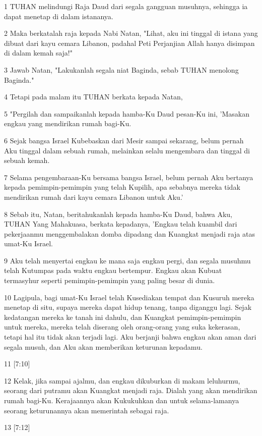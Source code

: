 \par 1 TUHAN melindungi Raja Daud dari segala gangguan musuhnya, sehingga ia dapat menetap di dalam istananya.
\par 2 Maka berkatalah raja kepada Nabi Natan, "Lihat, aku ini tinggal di istana yang dibuat dari kayu cemara Libanon, padahal Peti Perjanjian Allah hanya disimpan di dalam kemah saja!"
\par 3 Jawab Natan, "Lakukanlah segala niat Baginda, sebab TUHAN menolong Baginda."
\par 4 Tetapi pada malam itu TUHAN berkata kepada Natan,
\par 5 "Pergilah dan sampaikanlah kepada hamba-Ku Daud pesan-Ku ini, 'Masakan engkau yang mendirikan rumah bagi-Ku.
\par 6 Sejak bangsa Israel Kubebaskan dari Mesir sampai sekarang, belum pernah Aku tinggal dalam sebuah rumah, melainkan selalu mengembara dan tinggal di sebuah kemah.
\par 7 Selama pengembaraan-Ku bersama bangsa Israel, belum pernah Aku bertanya kepada pemimpin-pemimpin yang telah Kupilih, apa sebabnya mereka tidak mendirikan rumah dari kayu cemara Libanon untuk Aku.'
\par 8 Sebab itu, Natan, beritahukanlah kepada hamba-Ku Daud, bahwa Aku, TUHAN Yang Mahakuasa, berkata kepadanya, 'Engkau telah kuambil dari pekerjaanmu menggembalakan domba dipadang dan Kuangkat menjadi raja atas umat-Ku Israel.
\par 9 Aku telah menyertai engkau ke mana saja engkau pergi, dan segala musuhmu telah Kutumpas pada waktu engkau bertempur. Engkau akan Kubuat termasyhur seperti pemimpin-pemimpin yang paling besar di dunia.
\par 10 Lagipula, bagi umat-Ku Israel telah Kusediakan tempat dan Kusuruh mereka menetap di situ, supaya mereka dapat hidup tenang, tanpa diganggu lagi. Sejak kedatangan mereka ke tanah ini dahulu, dan Kuangkat pemimpin-pemimpin untuk mereka, mereka telah diserang oleh orang-orang yang suka kekerasan, tetapi hal itu tidak akan terjadi lagi. Aku berjanji bahwa engkau akan aman dari segala musuh, dan Aku akan memberikan keturunan kepadamu.
\par 11 [7:10]
\par 12 Kelak, jika sampai ajalmu, dan engkau dikuburkan di makam leluhurmu, seorang dari putramu akan Kuangkat menjadi raja. Dialah yang akan mendirikan rumah bagi-Ku. Kerajaannya akan Kukukuhkan dan untuk selama-lamanya seorang keturunannya akan memerintah sebagai raja.
\par 13 [7:12]
